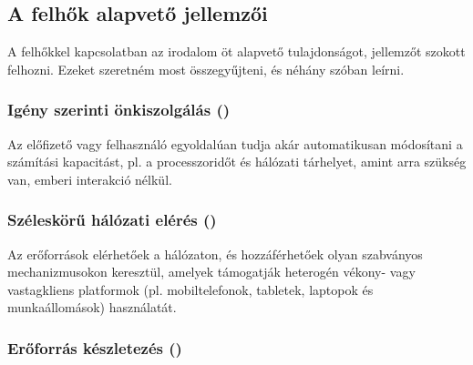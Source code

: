 \subsection{A felhők alapvető jellemzői}
A felhőkkel kapcsolatban az irodalom\cite{nistsp800-145} öt alapvető tulajdonságot, jellemzőt szokott felhozni. Ezeket szeretném most összegyűjteni, és néhány szóban leírni.
 
\subsubsection{Igény szerinti önkiszolgálás ()}

Az előfizető vagy felhasználó egyoldalúan tudja akár automatikusan módosítani a számítási kapacitást, pl. a processzoridőt és hálózati tárhelyet, amint arra szükség van, emberi interakció nélkül.

\subsubsection{Széleskörű hálózati elérés ()}

Az erőforrások elérhetőek a hálózaton, és hozzáférhetőek olyan szabványos mechanizmusokon keresztül, amelyek támogatják heterogén vékony- vagy vastagkliens platformok (pl. mobiltelefonok, tabletek, laptopok és munkaállomások) használatát.

\subsubsection{Erőforrás készletezés ()}

